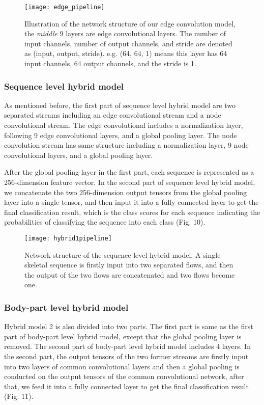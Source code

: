 \documentclass[a4paper,11pt]{article}
\begin{document}
\begin{figure}
\centering
\texttt{[image: edge\_pipeline]}
\caption{Illustration of the network structure of our edge convolution model, the {\it middle} 9 layers are edge convolutional layers. The number of input channels, number of output channels, and stride are denoted as (input, output, stride). e.g. (64, 64, 1) means this layer has 64 input channels, 64 output channels, and the stride is 1.}
\label{fig:example}
\end{figure}

\subsubsection{Sequence level hybrid model}
As mentioned before, the first part of sequence level hybrid model are two separated streams including an edge convolutional stream and a node convolutional stream. The edge convolutional includes a normalization layer, following 9 edge convolutional layers, and a global pooling layer. The node convolution stream has same structure including a normalization layer, 9 node convolutional layers, and a global pooling layer. 

After the global pooling layer in the first part, each sequence is represented as a 256-dimension feature vector. In the second part of sequence level hybrid model, we concatenate the two 256-dimension output tensors from the global pooling layer into a single tensor, and then input it into a fully connected layer to get the final classification result, which is the class scores for each sequence indicating the probabilities of classifying the sequence into each class (Fig. 10). 



\begin{figure}
\centering
\texttt{[image: hybrid1pipeline]}
\caption{Network structure of the sequence level hybrid model. A single skeletal sequence is firstly input into two separated flows, and then the output of the two flows are concatenated and two flows become one.}
\label{fig:example}
\end{figure}





\subsubsection{Body-part level hybrid model}
Hybrid model 2 is also divided into two parts. The first part is same as the first part of body-part level hybrid model, except that the global pooling layer is removed. The second part of body-part level hybrid model includes 4 layers. In the second part, the output tensors of the two former streams are firstly input into two layers of common convolutional layers and then a global pooling is conducted on the output tensors of the common convolutional network, after that, we feed it into a fully connected layer to get the final classification result (Fig. 11).
\end{document}
